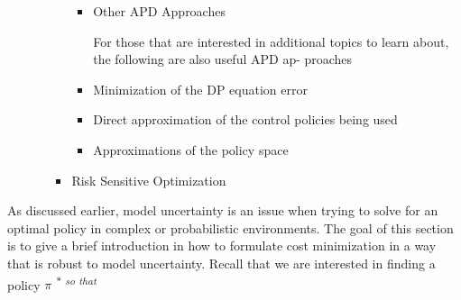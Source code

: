 \documentclass[12pt,twoside]{article}
\begin{document}
\begin{itemize}
\begin{itemize}
\begin{itemize}
\begin{itemize}
\vspace{\baselineskip}
	\item Other APD Approaches\par


\vspace{\baselineskip}
{\fontsize{10pt}{12.0pt}\selectfont For those that are interested in additional topics to learn about, the following are also useful APD ap- proaches\par}\par


\vspace{\baselineskip}
	\item {\fontsize{10pt}{12.0pt}\selectfont Minimization of the DP equation error\par}\par

	\item {\fontsize{10pt}{12.0pt}\selectfont Direct approximation of the control policies being used\par}\par

	\item {\fontsize{10pt}{12.0pt}\selectfont Approximations of the policy space\par}
\end{itemize}\par


\vspace{\baselineskip}
	\item Risk Sensitive Optimization
\end{itemize}
\end{itemize}
\end{itemize}\par


\vspace{\baselineskip}
\begin{adjustwidth}{0.08in}{0.58in}
{\fontsize{10pt}{12.0pt}\selectfont As discussed earlier, model uncertainty is an issue when trying to solve for an optimal policy in complex or probabilistic environments. The goal of this section is to give a brief introduction in how to formulate cost minimization in a way that is robust to model uncertainty. Recall that we are interested in finding a policy \textit{$ \pi $ \textsuperscript{$\ast$  so that}}\par}\par

\end{adjustwidth}
\end{document}
